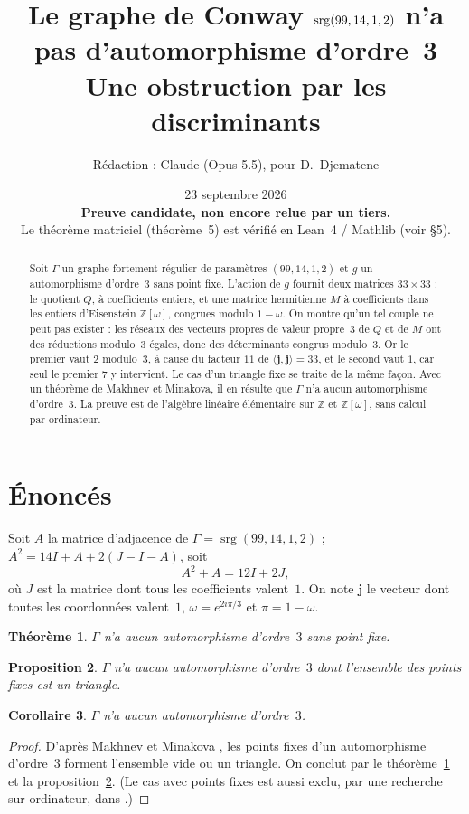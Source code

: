 \documentclass[11pt,a4paper]{article}
\title{Le graphe de Conway $\srg(99,14,1,2)$ n'a pas d'automorphisme d'ordre~3\\[3pt]
\large Une obstruction par les discriminants}
\author{Rédaction : Claude (Opus 5.5), pour D.~Djematene}
\date{23 septembre 2026 \\[4pt]
\textcolor{red!60!black}{\textbf{Preuve candidate, non encore relue par un tiers.}}\\[2pt]
\small Le théorème matriciel (théorème~5) est vérifié en Lean~4 / Mathlib (voir §5).}
\newtheorem{theorem}{Théorème}
\newtheorem{proposition}[theorem]{Proposition}
\newtheorem{corollary}[theorem]{Corollaire}
\theoremstyle{remark}
\newcommand{\Z}{\mathbb{Z}}
\newcommand{\one}{\mathbf{j}}
\newcommand{\srg}{\operatorname{srg}}
\begin{document}
\maketitle

\begin{abstract}
Soit $\Gamma$ un graphe fortement régulier de paramètres $(99,14,1,2)$ et $g$ un automorphisme d'ordre~3 sans point fixe.
L'action de $g$ fournit deux matrices $33\times 33$ : le quotient $Q$, à coefficients entiers, et une matrice hermitienne $M$ à
coefficients dans les entiers d'Eisenstein $\Z[\omega]$, congrues modulo $1-\omega$. On montre qu'un tel couple ne peut pas exister :
les réseaux des vecteurs propres de valeur propre~$3$ de $Q$ et de $M$ ont des réductions modulo~3 égales, donc des
déterminants congrus modulo~3. Or le premier vaut $2$ modulo~3, à cause du facteur $11$ de $\langle\one,\one\rangle=33$,
et le second vaut $1$, car seul le premier $7$ y intervient. Le cas d'un triangle fixe se traite de la même façon.
Avec un théorème de Makhnev et Minakova, il en résulte que $\Gamma$ n'a aucun automorphisme d'ordre~3.
La preuve est de l'algèbre linéaire élémentaire sur $\Z$ et $\Z[\omega]$, sans calcul par ordinateur.
\end{abstract}

\section{Énoncés}

Soit $A$ la matrice d'adjacence de $\Gamma=\srg(99,14,1,2)$ ; $A^2=14I+A+2(J-I-A)$, soit
\begin{equation}\label{eq:srg}
A^2+A=12I+2J ,
\end{equation}
où $J$ est la matrice dont tous les coefficients valent~$1$. On note $\one$ le vecteur dont toutes les coordonnées valent~$1$,
$\omega=e^{2i\pi/3}$ et $\pi=1-\omega$.

\begin{theorem}\label{thm:libre}
$\Gamma$ n'a aucun automorphisme d'ordre~$3$ sans point fixe.
\end{theorem}

\begin{proposition}\label{prop:triangle}
$\Gamma$ n'a aucun automorphisme d'ordre~$3$ dont l'ensemble des points fixes est un triangle.
\end{proposition}

\begin{corollary}\label{cor:tout}
$\Gamma$ n'a aucun automorphisme d'ordre~$3$.
\end{corollary}
\begin{proof}
D'après Makhnev et Minakova \cite{MM04}, les points fixes d'un automorphisme d'ordre~3 forment l'ensemble vide ou un triangle.
On conclut par le théorème~\ref{thm:libre} et la proposition~\ref{prop:triangle}. (Le cas avec points fixes est aussi exclu, par
une recherche sur ordinateur, dans \cite{B09,BL11}.)
\end{proof}
\end{document}
